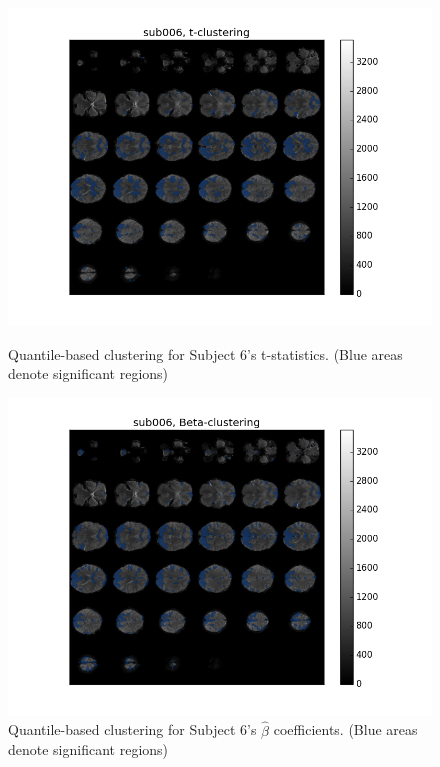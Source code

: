 


\begin{figure}[H]
\centering
\begin{minipage}[b]{.66\linewidth}
	\centering
	\includegraphics[width=.8\linewidth]{../images/sub006_t_overlay.png} 
	\caption{Quantile-based clustering for Subject 6's t-statistics. 
	(Blue areas denote significant regions)}
	\label{fig:clustert}
\end{minipage}	

\begin{minipage}[b]{.66\linewidth}
	\centering
		\includegraphics[width=.8\linewidth]{../images/sub006_beta_overlay.png} 
	\caption{Quantile-based clustering for Subject 6's $\hat{\beta}$ coefficients. 
	(Blue areas denote significant regions)}
	\label{fig:clusterbeta}
\end{minipage}


\end{figure}
